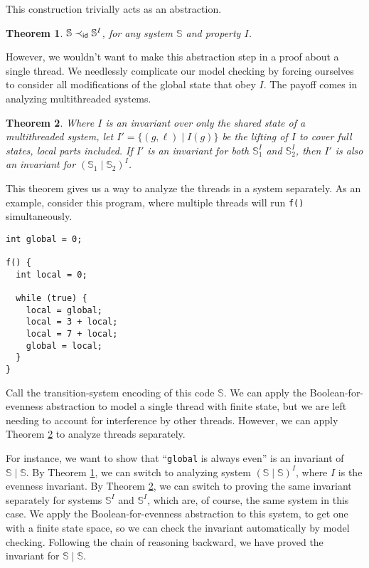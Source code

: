 \documentclass{amsbook}
\newtheorem{theorem}{Theorem}[chapter]
\theoremstyle{definition}
\theoremstyle{remark}
\numberwithin{section}{chapter}
\numberwithin{equation}{chapter}
\begin{document}
This construction trivially acts as an abstraction.
\begin{theorem}\label{shared_invariant_abstract}
  \abstraction
  $\mathbb S \prec_\mathsf{id} {\mathbb S}^I$, for any system $\mathbb S$ and property $I$.
\end{theorem}

\newcommand{\modularity}[0]{\marginpar{\fbox{\textbf{Modularity}}}}

However, we wouldn't want to make this abstraction step in a proof about a single thread.
We needlessly complicate our model checking by forcing ourselves to consider all modifications of the global state that obey $I$.
The payoff comes in analyzing multithreaded systems.
\begin{theorem}\label{shared_invariant_modular}
  \modularity
  Where $I$ is an invariant over only the shared state of a multithreaded system, let $I' = \{(g, \ell) \mid I(g)\}$ be the lifting of $I$ to cover full states, local parts included.  If $I'$ is an invariant for both ${\mathbb S}_1^I$ and ${\mathbb S}_2^I$, then $I'$ is also an invariant for $({\mathbb S}_1 \mid {\mathbb S}_2)^I$.
\end{theorem}

This theorem gives us a way to analyze the threads in a system separately.
As an example, consider this program, where multiple threads will run \texttt{f()} simultaneously.
\begin{verbatim}
int global = 0;

f() {
  int local = 0;

  while (true) {
    local = global;
    local = 3 + local;
    local = 7 + local;
    global = local;
  }
}
\end{verbatim}

Call the transition-system encoding of this code $\mathbb S$.
We can apply the Boolean-for-evenness abstraction to model a single thread with finite state, but we are left needing to account for interference by other threads.
However, we can apply Theorem \ref{shared_invariant_modular} to analyze threads separately.

For instance, we want to show that ``\texttt{global} is always even'' is an invariant of ${\mathbb S} \mid {\mathbb S}$.
By Theorem \ref{shared_invariant_abstract}, we can switch to analyzing system $({\mathbb S} \mid {\mathbb S})^I$, where $I$ is the evenness invariant.
By Theorem \ref{shared_invariant_modular}, we can switch to proving the same invariant separately for systems ${\mathbb S}^I$ and ${\mathbb S}^I$, which are, of course, the same system in this case.
We apply the Boolean-for-evenness abstraction to this system, to get one with a finite state space, so we can check the invariant automatically by model checking.
Following the chain of reasoning backward, we have proved the invariant for ${\mathbb S} \mid {\mathbb S}$.
\end{document}
